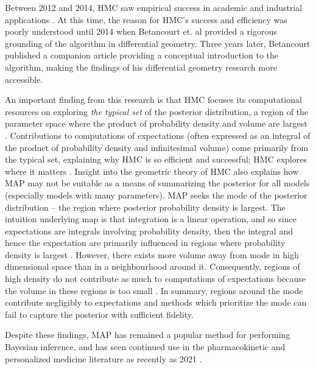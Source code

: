 Between 2012 and 2014, HMC saw empirical success in academic and industrial applications  \cite{betancourt2014geometric, Carpenter2017-qf}.  At this time, the reason for HMC's success and efficiency was poorly understood until 2014 when  Betancourt et. al \cite{betancourt2014geometric} provided a rigorous grounding of the algorithm in differential geometry.  Three years later, Betancourt published a companion article \cite{Betancourt2017-ak} providing a conceptual introduction to the algorithm, making the findings of his differential geometry research more accessible.

An important finding from this research is that HMC focuses its computational resources on exploring \textit{the typical set} of the posterior distribution, a region of the parameter space where the product of probability density and volume are largest \cite{Betancourt2017-ak}.  Contributions to computations of expectations  (often expressed as an integral of the product of probability density and infinitesimal volume) come primarily from the typical set, explaining why HMC is so efficient and successful; HMC explores where it matters \cite{Betancourt2017-ak}.  Insight into the geometric theory of HMC also explains how MAP may not be suitable as a means of summarizing the posterior for all models (especially models with many parameters).  MAP seeks the mode of the posterior distribution -- the region where posterior probability density is largest.  The intuition underlying map is that integration is a linear operation, and so since expectations are integrals involving probability density, then the integral and hence the expectation are primarily influenced in regions where probability density is largest \cite{Betancourt2017-ak}.  However, there exists more volume away from mode in high dimensional space than in a  neighbourhood around it.  Consequently, regions of high density do not contribute as much to computations of expectations because the volume in these regions is too small \cite{Betancourt2017-ak}.  In summary, regions around the mode contribute negligibly to expectations and methods which prioritize the mode can fail to capture the posterior with sufficient fidelity.

Despite these findings, MAP has remained a popular method for performing Bayesian inference, and has seen continued use in the pharmacokinetic and personalized medicine literature as recently as 2021 \needscite.


